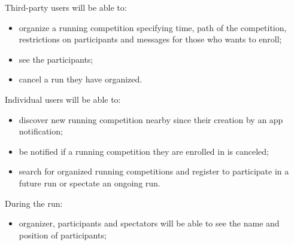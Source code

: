 Third-party users will be able to: 
\begin{itemize}
\item 
organize a running competition specifying time, path of the competition, restrictions on participants and messages for those who wants to enroll;
\item 
see the participants; 
\item 
cancel a run they have organized. 
\end{itemize}
Individual users will be able to: 
\begin{itemize}
\item 
discover new running competition nearby since their creation by an app notification; 
\item 
be notified if a running competition they are enrolled in is canceled; 
\item 
search for organized running competitions and register to participate in a future run or spectate an ongoing run.
\end{itemize}
During the run: 
\begin{itemize}
\item 
organizer, participants and spectators will be able to see the name and position of participants; 
\end{itemize}

